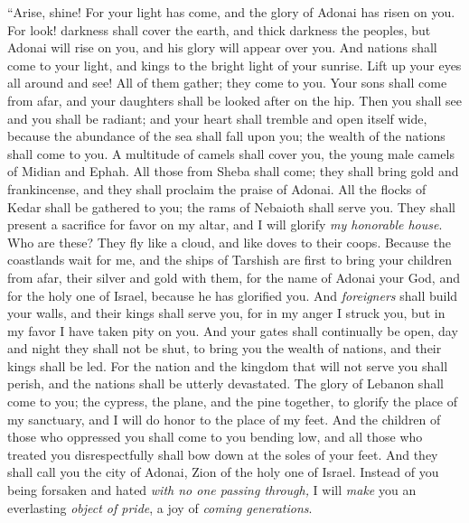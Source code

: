 \begin{biblechapter} %
 “Arise, shine! For your light has come, 
and the glory of Adonai has risen on you.
\verse For look! darkness shall cover the earth, 
and thick darkness the peoples, 
but Adonai will rise on you, 
and his glory will appear over you.
\verse And nations shall come to your light, 
and kings to the bright light of your sunrise.
\verse Lift up your eyes all around and see! 
All of them gather; they come to you. 
Your sons shall come from afar, 
and your daughters shall be looked after on the hip.
\verse Then you shall see 
and you shall be radiant; 
and your heart shall tremble 
and open itself wide, 
because the abundance of the sea shall fall upon you; 
the wealth of the nations shall come to you.
\verse A multitude of camels shall cover you, 
the young male camels of Midian and Ephah. 
All those from Sheba shall come; 
they shall bring gold and frankincense, 
and they shall proclaim the praise of Adonai.
\verse All the flocks of Kedar shall be gathered to you; 
the rams of Nebaioth shall serve you. 
They shall present a sacrifice for favor on my altar, 
and I will glorify \textit{my honorable house}.
\verse Who are these? They fly like a cloud, 
and like doves to their coops.
\verse Because the coastlands wait for me, 
and the ships of Tarshish are first 
to bring your children from afar, 
their silver and gold with them, 
for the name of Adonai your God, 
and for the holy one of Israel, because he has glorified you.
\verse And \textit{foreigners} shall build your walls, 
and their kings shall serve you, 
for in my anger I struck you, 
but in my favor I have taken pity on you.
\verse And your gates shall continually be open, 
day and night they shall not be shut, 
to bring you the wealth of nations, 
and their kings shall be led.
\verse For the nation and the kingdom that will not serve you shall perish, 
and the nations shall be utterly devastated.
\verse The glory of Lebanon shall come to you; 
the cypress, the plane, and the pine together, 
to glorify the place of my sanctuary, 
and I will do honor to the place of my feet.
\verse And the children of those who oppressed you shall come to you bending low, 
and all those who treated you disrespectfully shall bow down at the soles of your feet. 
And they shall call you the city of Adonai, 
Zion of the holy one of Israel.
\verse Instead of you being forsaken 
and hated \textit{with no one passing through,} 
I will \textit{make} you an everlasting \textit{object of pride}, 
a joy of \textit{coming generations}.

\end{biblechapter}
